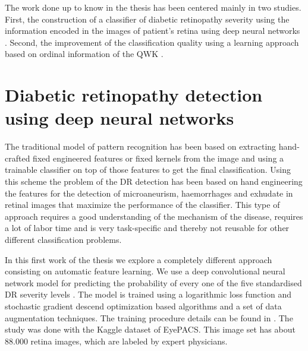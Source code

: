 \documentclass{dcsm}
\begin{document}
The work done up to know in the thesis has been centered mainly in two studies. First, the construction of a classifier of diabetic retinopathy severity using the information encoded in the images of patient's retina using deep neural networks \cite{DBLP:conf/ccia/TorreVP16}. Second, the improvement of the classification quality using a learning approach based on ordinal information of the QWK \cite{delaTorre2017}.

\section{Diabetic retinopathy detection using deep neural networks}

The traditional model of pattern recognition has been based on extracting hand-crafted fixed engineered features or fixed kernels from the image and using a trainable classifier on top of those features to get the final classification. Using this scheme the problem of the DR detection has been based on hand engineering the features for the detection of microaneurism, haemorrhages and exhudate in retinal images that maximize the performance of the classifier. This type of approach requires a good understanding of the mechanism of the disease, requires a lot of labor time and is very task-specific and thereby not reusable for other different classification problems.

In this first work of the thesis we explore a completely different approach consisting on automatic feature learning. We use a deep convolutional neural network model for predicting the probability of every one of the five standardised DR severity levels \cite{DBLP:conf/ccia/TorreVP16}. The model is trained using a logarithmic loss function and stochastic gradient descend optimization based algorithms and a set of data augmentation techniques. The training procedure details can be found in \cite{DBLP:conf/ccia/TorreVP16}. The study was done with the Kaggle dataset of EyePACS. This image set has about 88.000 retina images, which are labeled by expert physicians.
\end{document}
